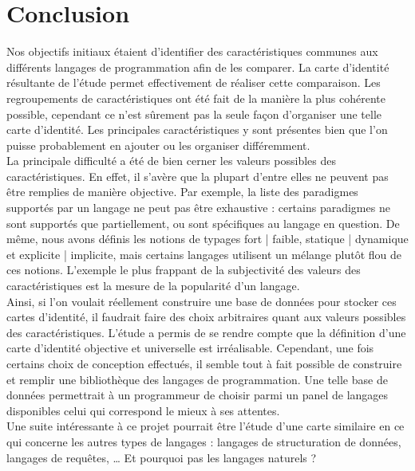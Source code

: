 \section{Conclusion}

Nos objectifs initiaux étaient d'identifier des caractéristiques communes aux différents langages de programmation afin de les comparer. La carte d'identité résultante de l'étude permet effectivement de réaliser cette comparaison. Les regroupements de caractéristiques ont été fait de la manière la plus cohérente possible, cependant ce n'est sûrement pas la seule façon d'organiser une telle carte d'identité. Les principales caractéristiques y sont présentes bien que l'on puisse probablement en ajouter ou les organiser différemment.\\

La principale difficulté a été de bien cerner les valeurs possibles des caractéristiques. En effet, il s'avère que la plupart d'entre elles ne peuvent pas être remplies de manière objective. Par exemple, la liste des paradigmes supportés par un langage ne peut pas être exhaustive : certains paradigmes ne sont supportés que partiellement, ou sont spécifiques au langage en question. De même, nous avons définis les notions de typages fort | faible, statique | dynamique et explicite | implicite, mais certains langages utilisent un mélange plutôt flou de ces notions. L'exemple le plus frappant de la subjectivité des valeurs des caractéristiques est la mesure de la popularité d'un langage.\\

Ainsi, si l'on voulait réellement construire une base de données pour stocker ces cartes d'identité, il faudrait faire des choix arbitraires quant aux valeurs possibles des caractéristiques. L'étude a permis de se rendre compte que la définition d'une carte d'identité objective et universelle est irréalisable. Cependant, une fois certains choix de conception effectués, il semble tout à fait possible de construire et remplir une bibliothèque des langages de programmation. Une telle base de données permettrait à un programmeur de choisir parmi un panel de langages disponibles celui qui correspond le mieux à ses attentes.\\

Une suite intéressante à ce projet pourrait être l'étude d'une carte similaire en ce qui concerne les autres types de langages : langages de structuration de données, langages de requêtes, … Et pourquoi pas les langages naturels ?